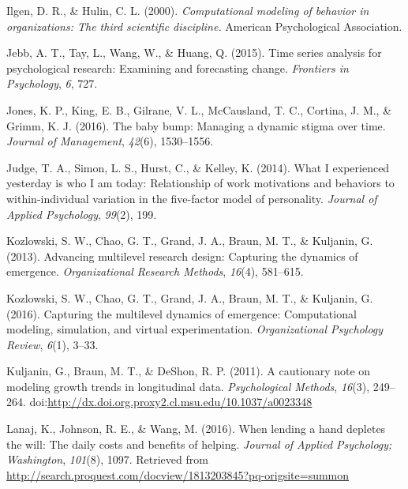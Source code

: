 \documentclass[english,,man]{apa6}
\theoremstyle{definition}
\theoremstyle{definition}
\theoremstyle{definition}
\theoremstyle{remark}
\begin{document}
\leavevmode\hypertarget{ref-ilgen_computational_2000}{}%
Ilgen, D. R., \& Hulin, C. L. (2000). \emph{Computational modeling of
behavior in organizations: The third scientific discipline.} American
Psychological Association.

\leavevmode\hypertarget{ref-jebb2015time}{}%
Jebb, A. T., Tay, L., Wang, W., \& Huang, Q. (2015). Time series
analysis for psychological research: Examining and forecasting change.
\emph{Frontiers in Psychology}, \emph{6}, 727.

\leavevmode\hypertarget{ref-jones_baby_2016}{}%
Jones, K. P., King, E. B., Gilrane, V. L., McCausland, T. C., Cortina,
J. M., \& Grimm, K. J. (2016). The baby bump: Managing a dynamic stigma
over time. \emph{Journal of Management}, \emph{42}(6), 1530--1556.

\leavevmode\hypertarget{ref-judge_what_2014}{}%
Judge, T. A., Simon, L. S., Hurst, C., \& Kelley, K. (2014). What I
experienced yesterday is who I am today: Relationship of work
motivations and behaviors to within-individual variation in the
five-factor model of personality. \emph{Journal of Applied Psychology},
\emph{99}(2), 199.

\leavevmode\hypertarget{ref-kozlowski_advancing_2013}{}%
Kozlowski, S. W., Chao, G. T., Grand, J. A., Braun, M. T., \& Kuljanin,
G. (2013). Advancing multilevel research design: Capturing the dynamics
of emergence. \emph{Organizational Research Methods}, \emph{16}(4),
581--615.

\leavevmode\hypertarget{ref-kozlowski_capturing_2016}{}%
Kozlowski, S. W., Chao, G. T., Grand, J. A., Braun, M. T., \& Kuljanin,
G. (2016). Capturing the multilevel dynamics of emergence: Computational
modeling, simulation, and virtual experimentation. \emph{Organizational
Psychology Review}, \emph{6}(1), 3--33.

\leavevmode\hypertarget{ref-kuljanin_cautionary_2011}{}%
Kuljanin, G., Braun, M. T., \& DeShon, R. P. (2011). A cautionary note
on modeling growth trends in longitudinal data. \emph{Psychological
Methods}, \emph{16}(3), 249--264.
doi:\href{https://doi.org/http://dx.doi.org.proxy2.cl.msu.edu/10.1037/a0023348}{http://dx.doi.org.proxy2.cl.msu.edu/10.1037/a0023348}

\leavevmode\hypertarget{ref-lanaj_when_2016}{}%
Lanaj, K., Johnson, R. E., \& Wang, M. (2016). When lending a hand
depletes the will: The daily costs and benefits of helping.
\emph{Journal of Applied Psychology; Washington}, \emph{101}(8), 1097.
Retrieved from
\url{http://search.proquest.com/docview/1813203845?pq-origsite=summon}
\end{document}
